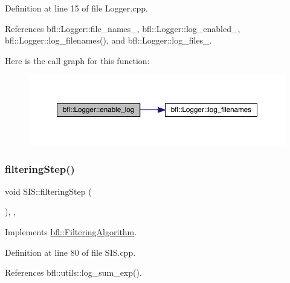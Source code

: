 Definition at line 15 of file Logger.\+cpp.



References bfl\+::\+Logger\+::file\+\_\+names\+\_\+, bfl\+::\+Logger\+::log\+\_\+enabled\+\_\+, bfl\+::\+Logger\+::log\+\_\+filenames(), and bfl\+::\+Logger\+::log\+\_\+files\+\_\+.

Here is the call graph for this function\+:
\nopagebreak
\begin{figure}[H]
\begin{center}
\leavevmode
\includegraphics[width=350pt]{classbfl_1_1Logger_ae94b97b6e8d7902e8ce048384813122e_cgraph}
\end{center}
\end{figure}
\mbox{\label{classbfl_1_1SIS_a582f06cc5456d2cc6ed8f90087cbbb4c}} 
\subsubsection{\texorpdfstring{filtering\+Step()}{filteringStep()}}
{\footnotesize\ttfamily void S\+I\+S\+::filtering\+Step (\begin{DoxyParamCaption}{ }\end{DoxyParamCaption})\hspace{0.3cm}{\ttfamily [override]}, {\ttfamily [protected]}, {\ttfamily [virtual]}}



Implements \mbox{\hyperlink{classbfl_1_1FilteringAlgorithm_ab3bceb43b5810a4bf1da884b8a0b145a}{bfl\+::\+Filtering\+Algorithm}}.



Definition at line 80 of file S\+I\+S.\+cpp.



References bfl\+::utils\+::log\+\_\+sum\+\_\+exp().

